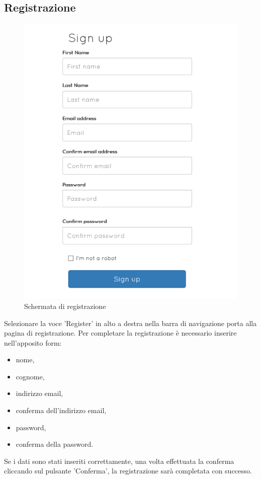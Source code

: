 \documentclass[a4paper, titlepage]{article}
\begin{document}
	\subsection{Registrazione}
	\begin{figure}[!h]
		\centering
		\includegraphics[scale=1]{Img/register.png}
		\caption{Schermata di registrazione}
	\end{figure}
	Selezionare la voce 'Register' in alto a destra nella barra di navigazione porta alla pagina di registrazione.
	Per completare la registrazione è necessario inserire nell'apposito form:
	\begin{itemize}
		\item nome,
		\item cognome,
		\item indirizzo email,
		\item conferma dell'indirizzo email,
		\item password,
		\item conferma della password.
	\end{itemize}
	Se i dati sono stati inseriti correttamente, una volta effettuata la conferma cliccando sul pulsante 'Conferma', la registrazione sarà completata con successo.
\end{document}
